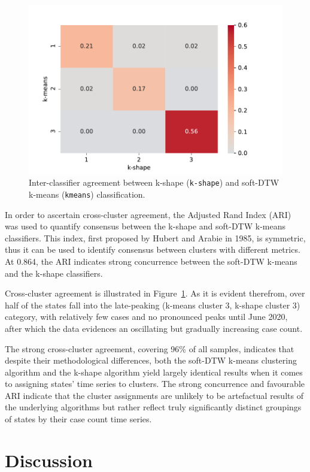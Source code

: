 \documentclass{article}
\begin{document}
\begin{figure}
	\includegraphics[width=0.5\linewidth]{figures/inter-classifier}
	\centering
	\caption{Inter-classifier agreement between k-shape (\texttt{k-shape}) and soft-DTW k-means (\texttt{kmeans}) classification.}
	\label{fig:inter_classifier}
\end{figure}

In order to ascertain cross-cluster agreement, the Adjusted Rand Index (ARI) was used to quantify consensus between the k-shape and soft-DTW k-means classifiers.\cite{hubert1985comparing} This index, first proposed by Hubert and Arabie in 1985, is symmetric, thus it can be used to identify consensus between clusters with different metrics. At 0.864, the ARI indicates strong concurrence between the soft-DTW k-means and the k-shape classifiers.

Cross-cluster agreement is illustrated in Figure~\ref{fig:inter_classifier}. As it is evident therefrom, over half of the states fall into the late-peaking (k-means cluster 3, k-shape cluster 3) category, with relatively few cases and no pronounced peaks until June 2020, after which the data evidences an oscillating but gradually increasing case count. 

The strong cross-cluster agreement, covering 96\% of all samples, indicates that despite their methodological differences, both the soft-DTW k-means clustering algorithm and the k-shape algorithm yield largely identical results when it comes to assigning states' time series to clusters. The strong concurrence and favourable ARI indicate that the cluster assignments are unlikely to be artefactual results of the underlying algorithms but rather reflect truly significantly distinct groupings of states by their case count time series.



\section{Discussion} %
\label{sec:discussion}
\end{document}
